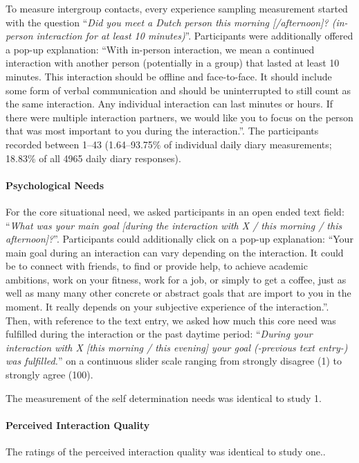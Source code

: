 To measure intergroup contacts, every experience sampling measurement
started with the question
``\textit{Did you meet a Dutch person this morning [/afternoon]? (in-person interaction for at least 10 minutes)}''.
Participants were additionally offered a pop-up explanation: ``With
in-person interaction, we mean a continued interaction with another
person (potentially in a group) that lasted at least 10 minutes. This
interaction should be offline and face-to-face. It should include some
form of verbal communication and should be uninterrupted to still count
as the same interaction. Any individual interaction can last minutes or
hours. If there were multiple interaction partners, we would like you to
focus on the person that was most important to you during the
interaction.''. The participants recorded between 1--43 (1.64--93.75\%
of individual daily diary measurements; 18.83\% of all 4965 daily diary
responses).

\paragraph{Psychological Needs}

For the core situational need, we asked participants in an open ended
text field:
``\textit{What was your main goal [during the interaction with X / this morning / this afternoon]?}''.
Participants could additionally click on a pop-up explanation: ``Your
main goal during an interaction can vary depending on the interaction.
It could be to connect with friends, to find or provide help, to achieve
academic ambitions, work on your fitness, work for a job, or simply to
get a coffee, just as well as many many other concrete or abstract goals
that are import to you in the moment. It really depends on your
subjective experience of the interaction.''. Then, with reference to the
text entry, we asked how much this core need was fulfilled during the
interaction or the past daytime period:
``\textit{During your interaction with X [this morning / this evening] your goal (-previous text entry-) was fulfilled.}''
on a continuous slider scale ranging from strongly disagree (1) to
strongly agree (100).

The measurement of the self determination needs was identical to study
1.

\paragraph{Perceived Interaction Quality}

The ratings of the perceived interaction quality was identical to study
one..

